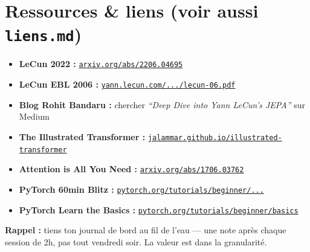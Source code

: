 \documentclass[a4paper,11pt]{article}
\begin{document}
\vspace{0.8cm}

\section{Ressources \& liens (voir aussi \texttt{liens.md})}

\begin{itemize}[itemsep=4pt]
  \item \textbf{LeCun 2022 :} \href{https://arxiv.org/abs/2206.04695}{\texttt{arxiv.org/abs/2206.04695}}
  \item \textbf{LeCun EBL 2006 :} \href{http://yann.lecun.com/exdb/publis/pdf/lecun-06.pdf}{\texttt{yann.lecun.com/.../lecun-06.pdf}}
  \item \textbf{Blog Rohit Bandaru :} chercher \textit{``Deep Dive into Yann LeCun's JEPA''} sur Medium
  \item \textbf{The Illustrated Transformer :} \href{https://jalammar.github.io/illustrated-transformer/}{\texttt{jalammar.github.io/illustrated-transformer}}
  \item \textbf{Attention is All You Need :} \href{https://arxiv.org/abs/1706.03762}{\texttt{arxiv.org/abs/1706.03762}}
  \item \textbf{PyTorch 60min Blitz :} \href{https://pytorch.org/tutorials/beginner/deep_learning_60min_blitz.html}{\texttt{pytorch.org/tutorials/beginner/...}}
  \item \textbf{PyTorch Learn the Basics :} \href{https://pytorch.org/tutorials/beginner/basics/intro.html}{\texttt{pytorch.org/tutorials/beginner/basics}}
\end{itemize}

\vspace{0.5cm}
\begin{tcolorbox}[colback=accentOrange!10, colframe=accentOrange, sharp corners]
  \textbf{\color{accentOrange} Rappel :} tiens ton journal de bord au fil de l'eau — une note après chaque session de 2h, pas tout vendredi soir. La valeur est dans la granularité.
\end{tcolorbox}
\end{document}
